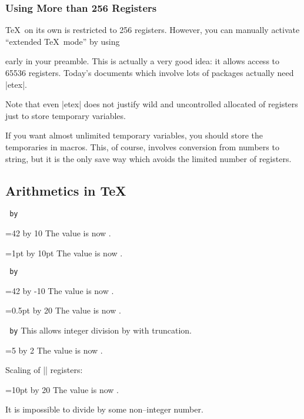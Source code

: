 \documentclass[a4paper]{ltxdoc}
\begin{document}
\subsubsection{Using More than 256 Registers}
\TeX\ on its own is restricted to 256 registers. However, you can manually activate ``extended \TeX\ mode'' by using
\begin{codeexample}
\usepackage{etex}	
\end{codeexample}
early in your preamble. This is actually a very good idea: it allows access to 65536 registers. Today's documents which involve lots of packages actually need |etex|.

Note that even |etex| does not justify wild and uncontrolled allocated of registers just to store temporary variables.

If you want almost unlimited temporary variables, you should store the temporaries in macros. This, of course, involves conversion from numbers to string, but it is the only save way which avoids the limited number of registers.

\subsection{Arithmetics in \TeX}
\begin{command}{\advance{}\texttt{ by}}
\begin{codeexample}[]
=42
\advance{} by 10
The value is now \the{}.
\end{codeexample}

\begin{codeexample}[]
=1pt
\advance{} by 10pt
The value is now \the{}.
\end{codeexample}
\end{command}

\begin{command}{\multiply{}\texttt{ by}}
\begin{codeexample}[]
=42
\multiply{} by -10
The value is now \the{}.
\end{codeexample}

\begin{codeexample}[]
=0.5pt
\multiply{} by 20
The value is now \the{}.
\end{codeexample}
\end{command}

\begin{command}{\divide{}\texttt{ by}}
	This allows integer division by  with truncation.
\begin{codeexample}[]
=5
\divide{} by 2
The value is now \the{}.
\end{codeexample}

	Scaling of |\dimen| registers:
\begin{codeexample}[]
=10pt
\divide{} by 20
The value is now \the{}.
\end{codeexample}

	It is impossible to divide by some non--integer number.
\end{command}
\end{document}
